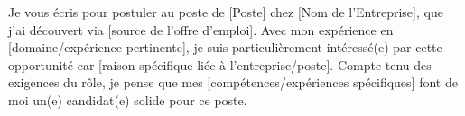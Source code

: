 
Je vous écris pour postuler au poste de [Poste] chez [Nom de l'Entreprise], que j'ai découvert via [source de l'offre d'emploi]. Avec mon expérience en [domaine/expérience pertinente], je suis particulièrement intéressé(e) par cette opportunité car [raison spécifique liée à l'entreprise/poste]. Compte tenu des exigences du rôle, je pense que mes [compétences/expériences spécifiques] font de moi un(e) candidat(e) solide pour ce poste.
